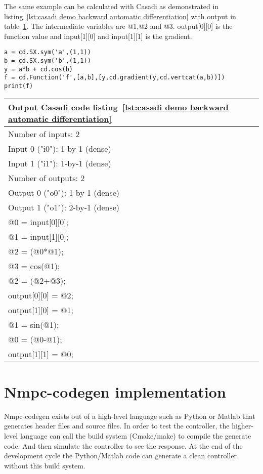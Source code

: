 The same example can be calculated with Casadi as demonstrated in listing~\ref{lst:casadi demo backward automatic differentiation} with output in table~\ref{tbl:output casadi demo backward automatic differentiation}. The intermediate variables are @1,@2 and @3. output[0][0] is the function value and input[1][0] and input[1][1] is the gradient. 

\begin{lstlisting}[caption={Casadi example automatic backward differentiation},label={lst:casadi demo backward automatic differentiation}]
a = cd.SX.sym('a',(1,1))
b = cd.SX.sym('b',(1,1))
y = a*b + cd.cos(b)
f = cd.Function('f',[a,b],[y,cd.gradient(y,cd.vertcat(a,b))])
print(f)
\end{lstlisting}


\begin{table}
	\begin{center}
		\begin{tabular}{ |l|  }
			\hline
			Output Casadi code listing~\ref{lst:casadi demo backward automatic differentiation} \\
			\hline
			Number of inputs: 2 \\
			Input 0 ("i0"): 1-by-1 (dense) \\
			Input 1 ("i1"): 1-by-1 (dense) \\
			Number of outputs: 2 \\
			Output 0 ("o0"): 1-by-1 (dense) \\
			Output 1 ("o1"): 2-by-1 (dense) \\
			@0 = input[0][0]; \\
			@1 = input[1][0]; \\
			@2 = (@0*@1); \\
			@3 = cos(@1); \\
			@2 = (@2+@3); \\
			output[0][0] = @2; \\
			output[1][0] = @1; \\
			@1 = sin(@1); \\
			@0 = (@0-@1); \\
			output[1][1] = @0; \\
			\hline   
		\end{tabular}
		\label{tbl:output casadi demo backward automatic differentiation}
	\end{center}
\end{table}



\section{Nmpc-codegen implementation}
Nmpc-codegen exists out of a high-level language such as Python or Matlab that generates header files and source files. In order to test the controller, the higher-level language can call the build system (Cmake/make) to compile the generate code. And then simulate the controller to see the response. At the end of the development cycle the Python/Matlab code can generate a clean controller without this build system.

